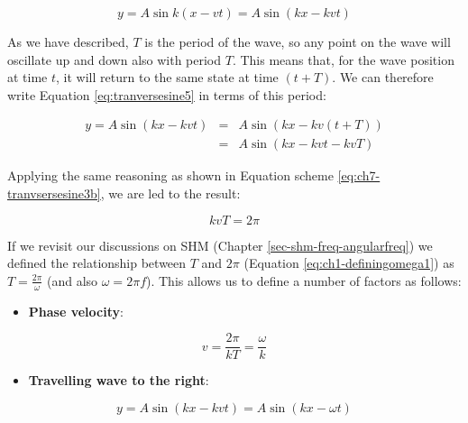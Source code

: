 \documentclass[
]{book}
\providecommand{\tightlist}{%
  \setlength{\itemsep}{0pt}\setlength{\parskip}{0pt}}
\begin{document}
\begin{equation}
y = A \sin k(x - vt) = A \sin (kx - kvt)
\label{eq:tranversesine5}
\end{equation}

As we have described, \(T\) is the period of the wave, so any point on the wave will oscillate up and down also with period \(T\). This means that, for the wave position at time \(t\), it will return to the same state at time \((t+T)\). We can therefore write Equation \eqref{eq:tranversesine5} in terms of this period:

\begin{equation}
\begin{array}{rcl}
y = A \sin \left( kx - kvt \right) &=& A \sin \left( kx - kv(t+T) \right) \\
&=& A \sin \left( kx - kvt - kvT \right)
\end{array}
\label{eq:ch7-travelling2}
\end{equation}

Applying the same reasoning as shown in Equation scheme \eqref{eq:ch7-tranvsersesine3b}, we are led to the result:

\begin{equation}
kvT = 2\pi
\end{equation}

If we revisit our discussions on SHM (Chapter \ref{sec-shm-freq-angularfreq}) we defined the relationship between \(T\) and \(2\pi\) (Equation \eqref{eq:ch1-definingomega1}) as \(T = \frac{2\pi}{\omega}\) (and also \(\omega = 2\pi f\)). This allows us to define a number of factors as follows:

\begin{itemize}
\tightlist
\item
  \textbf{Phase velocity}:
\end{itemize}

\begin{equation}
v = \frac{2\pi}{kT} = \frac{\omega}{k}
\label{eq:ch7-phasevel1}
\end{equation}

\begin{itemize}
\tightlist
\item
  \textbf{Travelling wave to the right}:
\end{itemize}

\begin{equation}
y = A \sin \left( kx - kvt \right) = A \sin \left( kx - \omega t \right)
\label{eq:ch7-travellingtoright1}
\end{equation}
\end{document}
